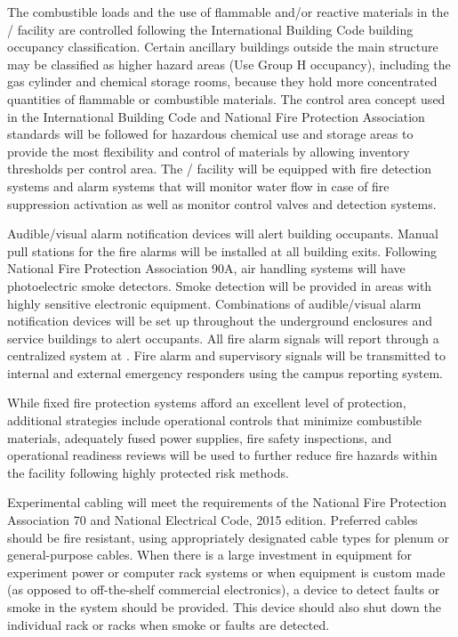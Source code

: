 The combustible loads and the use of flammable and/or reactive
materials in the / facility are controlled following
the International Building Code building occupancy
classification. Certain ancillary buildings outside the main structure
may be classified as higher hazard areas (Use Group H occupancy),
including the gas cylinder and chemical storage rooms, because they
hold more concentrated quantities of flammable or combustible
materials.  The control area concept used in the International Building Code and National Fire Protection Association standards will be followed for hazardous chemical use and storage
areas to provide the most flexibility and control of
materials by allowing inventory thresholds per control area.  The
/ facility will be equipped with fire detection systems and
alarm systems that will monitor water flow in case of fire suppression
activation as well as monitor control valves and detection systems.

Audible/visual alarm notification devices will alert building
occupants.  Manual pull stations for the fire alarms will be installed
at all building exits.  Following National Fire Protection Association 90A, air handling
systems will have photoelectric smoke detectors.  Smoke detection
will be provided in areas with highly sensitive electronic
equipment.  Combinations of audible/visual alarm notification devices will
be set up throughout the underground enclosures and service buildings
to alert occupants. All fire alarm signals will report through a
centralized system at \surf.  Fire alarm and supervisory signals will
be transmitted to internal and external emergency responders using
the campus reporting system.

While fixed fire protection systems afford an excellent level
of protection, additional strategies include operational controls
that minimize combustible materials, adequately
fused power supplies, fire safety inspections, and operational
readiness reviews will be used to further reduce fire hazards
within the facility following  highly protected risk methods.

Experimental cabling will meet the requirements of the National Fire Protection Association 70 and National
Electrical Code, 2015 edition.  Preferred cables should be fire
resistant, using appropriately designated cable types for plenum
or general-purpose cables.  When there is a
large investment in equipment for
experiment power or computer rack systems or when equipment is
custom made (as opposed to off-the-shelf commercial electronics), a
device to detect faults or smoke in the system should be provided.
This device should also shut down the individual rack or racks when 
smoke or faults are detected.


